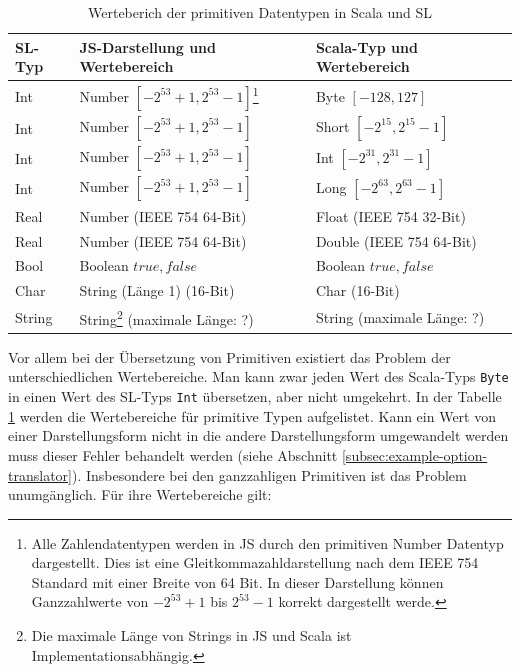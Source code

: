 \documentclass[12pt,bibtotoc]{scrreprt}
\begin{document}
\begin{savenotes}
\begin{table}[h]
\caption{Werteberich der primitiven Datentypen in Scala und SL\cite[S. 28-30]{Ecma2011}\cite{Oracle2011}}
\centering
\begin{tabular}{lll}
SL-Typ & JS-Darstellung und Wertebereich & Scala-Typ und Wertebereich \\
\midrule
Int    & Number $[-2^{53} + 1, 2^{53} -1]$\footnote{Alle Zahlendatentypen werden in \ac{JS} durch den primitiven Number Datentyp dargestellt. Dies ist eine Gleitkommazahldarstellung nach dem IEEE 754 Standard mit einer Breite von 64 Bit. In dieser Darstellung können Ganzzahlwerte von $-2^{53} + 1$ bis $2^{53} -1$ korrekt dargestellt werde.}    &  Byte  $[-128, 127]$\\
Int    & Number $[-2^{53} + 1, 2^{53} -1]$ & Short $[-2^{15}, 2^{15}-1]$\\
Int    & Number $[-2^{53} + 1, 2^{53} -1]$ & Int   $[-2^{31}, 2^{31}-1]$\\
Int    & Number $[-2^{53} + 1, 2^{53} -1]$ & Long  $[-2^{63}, 2^{63}-1]$\\
\addlinespace
Real   & Number (IEEE 754 64-Bit)          & Float  (IEEE 754 32-Bit)\\
Real   & Number (IEEE 754 64-Bit)          & Double (IEEE 754 64-Bit)\\
\addlinespace
Bool   & Boolean ${true, false}$           & Boolean ${true, false}$\\
\addlinespace
Char   & String (Länge 1) (16-Bit)         & Char (16-Bit)\\
\addlinespace
String& String\footnote{Die maximale Länge von Strings in \ac{JS} und Scala ist Implementationsabhängig.} (maximale Länge: ?)    &  String (maximale Länge: ?)\\
\end{tabular}
\label{tab:primitives-borders}
\end{table}
\end{savenotes}

Vor allem bei der Übersetzung von Primitiven existiert das Problem der unterschiedlichen Wertebereiche. Man kann zwar jeden Wert des Scala-Typs \lstinline!Byte! in einen Wert des SL-Typs \lstinline!Int! übersetzen, aber nicht umgekehrt. In der Tabelle \ref{tab:primitives-borders} werden die Wertebereiche für primitive Typen aufgelistet. Kann ein Wert von einer Darstellungsform nicht in die andere Darstellungsform umgewandelt werden muss dieser Fehler behandelt werden (siehe Abschnitt \ref{subsec:example-option-translator}). Insbesondere bei den ganzzahligen Primitiven ist das Problem unumgänglich.  Für ihre Wertebereiche gilt:
\end{document}
